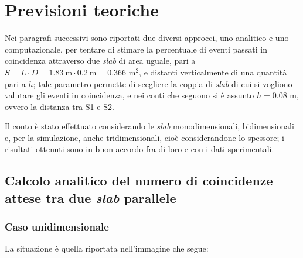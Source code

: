 \section{Previsioni teoriche}
Nei paragrafi successivi sono riportati due diversi approcci, uno analitico e uno computazionale, per tentare di stimare la percentuale di eventi passati in coincidenza attraverso due \emph{slab} di area uguale, pari a $S=L \cdot D = 1.83 \ \mbox{m} \cdot 0.2 \ \mbox{m} =0.366$ m$^2$, e distanti verticalmente di una quantità pari a $h$; tale parametro permette di scegliere la coppia di \emph{slab} di cui si vogliono valutare gli eventi in coincidenza, e nei conti che seguono si è assunto $h=0.08$ m, ovvero la distanza tra S1 e S2.

Il conto è stato effettuato considerando le \emph{slab} monodimensionali, bidimensionali e, per la simulazione, anche tridimensionali, cioè considerandone lo spessore; i risultati ottenuti sono in buon accordo fra di loro e con i dati sperimentali.
\subsection{Calcolo analitico del numero di coincidenze attese tra due \emph{slab} parallele}
\subsubsection{Caso unidimensionale}
La situazione è quella riportata nell'immagine che segue:
\newline

\newline

